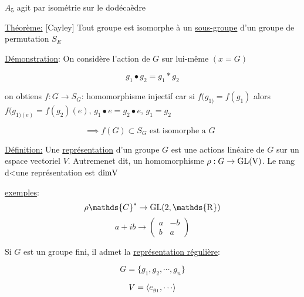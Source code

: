 $A_5$ agit par isométrie sur le dodécaèdre  

\underline{Théorème:} [Cayley] Tout groupe est isomorphe à un \underline{sous-groupe} d'un groupe de permutation $S_E$    


\underline{Démonstration}: On considère l'action de $G$ sur lui-même $(x = G)$

\[ g_1 \bullet g_2 = g_1 * g_2 \]

on obtiens $f: G\to S_G$: homomorphisme injectif car si $f(g_{1)} = f(g_1)$ alors $f(g_{1)(e)} = f(g_2)(e)$, $g_1 \bullet e = g_2 \bullet e$, $g_1 = g_2$

\[ \implies f(G) \subset S_G \text{ est isomorphe a $G$ } \]

\underline{Définition:} Une \underline{représentation} d'un groupe $G$ est une actions linéaire de $G$ sur un espace vectoriel $V$. Autremenet dit, un homomorphisme $ \rho: G \to \rm{GL}(V)$. Le rang d<une représentation est $\rm{dim}V$

\underline{exemples}: \[ \rho \mathds{C}^{*} \to \rm{GL}(2, \mathds{R}) \] 
\[ a+ib \to \begin{pmatrix} a & -b \\ b & a \end{pmatrix}  \]

Si $G$ est un groupe fini, il admet la \underline{représentation régulière}: 

\[ G = \{ g_1 , g_2, \dotsb , g_n  \}  \]

\[ V = \expval{e_{g_1}, \dotsb} \]



